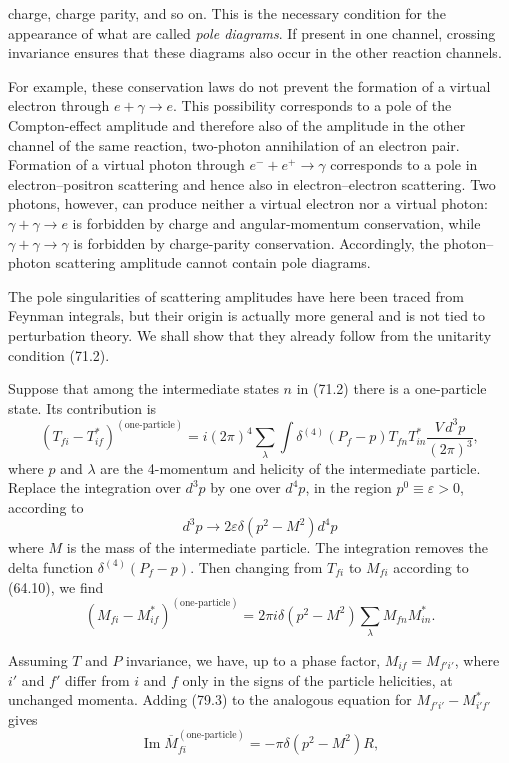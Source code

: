 charge, charge parity, and so on. This is the necessary condition for the appearance of what are called \emph{pole diagrams}. If present in one channel, crossing invariance ensures that these diagrams also occur in the other reaction channels.

For example, these conservation laws do not prevent the formation of a virtual electron through $e+\gamma\to e$. This possibility corresponds to a pole of the Compton-effect amplitude and therefore also of the amplitude in the other channel of the same reaction, two-photon annihilation of an electron pair. Formation of a virtual photon through $e^-+e^+\to\gamma$ corresponds to a pole in electron--positron scattering and hence also in electron--electron scattering. Two photons, however, can produce neither a virtual electron nor a virtual photon: $\gamma+\gamma\to e$ is forbidden by charge and angular-momentum conservation, while $\gamma+\gamma\to\gamma$ is forbidden by charge-parity conservation. Accordingly, the photon--photon scattering amplitude cannot contain pole diagrams.

The pole singularities of scattering amplitudes have here been traced from Feynman integrals, but their origin is actually more general and is not tied to perturbation theory. We shall show that they already follow from the unitarity condition (71.2).

Suppose that among the intermediate states $n$ in (71.2) there is a one-particle state. Its contribution is
\[
(T_{fi}-T_{if}^*)^{(\text{one-particle})}
=i(2\pi)^4\sum_\lambda\int\delta^{(4)}(P_f-p)T_{fn}T_{in}^*
\frac{V\,d^3p}{(2\pi)^3},
\]
where $p$ and $\lambda$ are the 4-momentum and helicity of the intermediate particle. Replace the integration over $d^3p$ by one over $d^4p$, in the region $p^0\equiv\varepsilon>0$, according to
\[
d^3p\to2\varepsilon\delta(p^2-M^2)d^4p
\]
where $M$ is the mass of the intermediate particle. The integration removes the delta function $\delta^{(4)}(P_f-p)$. Then changing from $T_{fi}$ to $M_{fi}$ according to (64.10), we find
\begin{equation}
(M_{fi}-M_{if}^*)^{(\text{one-particle})}
=2\pi i\delta(p^2-M^2)\sum_\lambda M_{fn}M_{in}^*.
\tag{79.3}
\end{equation}

Assuming $T$ and $P$ invariance, we have, up to a phase factor, $M_{if}=M_{f'i'}$, where $i'$ and $f'$ differ from $i$ and $f$ only in the signs of the particle helicities, at unchanged momenta. Adding (79.3) to the analogous equation for $M_{f'i'}-M_{i'f'}^*$ gives
\begin{equation}
\operatorname{Im}\overline M_{fi}^{(\text{one-particle})}
=-\pi\delta(p^2-M^2)R,
\tag{79.4}
\end{equation}

